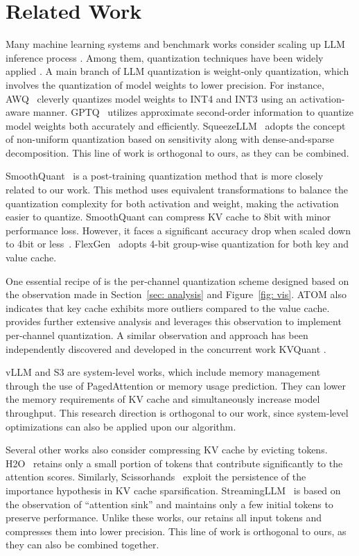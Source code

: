 \section{Related Work}

Many machine learning systems and benchmark works consider scaling up LLM inference process \citep{pope2023efficiently, yuan2024kv}.
Among them, quantization techniques have been widely applied \citep{gptq, lin2023awq, kim2023squeezellm, xu2023compress}. A main branch of LLM quantization is weight-only quantization, which involves the quantization of model weights to lower precision. For instance, AWQ~\citep{lin2023awq} cleverly quantizes model weights to INT4 and INT3 using an activation-aware manner. GPTQ~\citep{gptq} utilizes approximate second-order information to quantize model weights both accurately and efficiently. SqueezeLLM~\citep{kim2023squeezellm} adopts the concept of non-uniform quantization based on sensitivity along with dense-and-sparse decomposition. 
This line of work is orthogonal to ours, as they can be combined.

SmoothQuant~\citep{xiao2023smoothquant} is a post-training quantization method that is more closely related to our work. This method uses equivalent transformations to balance the quantization complexity for both activation and weight, making the activation easier to quantize. SmoothQuant can compress KV cache to 8bit with minor performance loss. However, it faces a significant accuracy drop when scaled down to 4bit or less~\citep{zhao2024atom}.
FlexGen~\citep{flexgen} adopts 4-bit group-wise quantization for both key and value cache.

One essential recipe of \kivi{} is the per-channel quantization scheme designed based on the observation made in Section~\ref{sec: analysis} and Figure~\ref{fig: vis}. 
ATOM \citep{zhao2024atom} also indicates that key cache exhibits more outliers compared to the value cache. \kivi{} provides further extensive analysis and leverages this observation to implement per-channel quantization. A similar observation and approach has been independently discovered and developed in the concurrent work KVQuant \citep{hooper2024kvquant}.

vLLM \citep{vllm} and S3 \citep{jin2023s} are system-level works, which include memory management through the use of PagedAttention or memory usage prediction. They can lower the memory requirements of KV cache and simultaneously increase model throughput. This research direction is orthogonal to our work, since system-level optimizations can also be applied upon our algorithm.

Several other works also consider compressing KV cache by evicting tokens. 
H2O~\citep{h2o} retains only a small portion of tokens that contribute significantly to the attention scores. Similarly, Scissorhands~\citep{liu2024scissorhands} exploit the persistence of the importance hypothesis in KV cache sparsification.  
StreamingLLM~\citep{xiao2023efficient} is based on the observation of ``attention sink'' and maintains only a few initial tokens to preserve performance. Unlike these works, our \kivi{} retains all input tokens and compresses them into lower precision. This line of work is orthogonal to ours, as they can also be combined together.